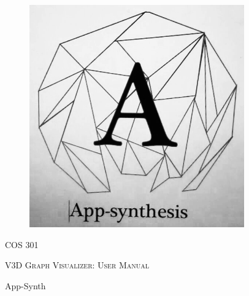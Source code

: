 \begin{titlepage}
	\begin{center}
		\begin{figure}[t]
			\centering
			\includegraphics[width=350px]{Images/logo.PNG}
		\end{figure}
		\begin{center}
			\textsc{\LARGE COS 301}
		\end{center}
		\begin{center}		
			\textsc{\LARGE V3D Graph Visualizer: User Manual}		
		\end{center}
		
		\begin{flushright} \large
			App-Synth \newline \emph{} \newline
		\end{flushright}


	\end{center}
\end{titlepage}
